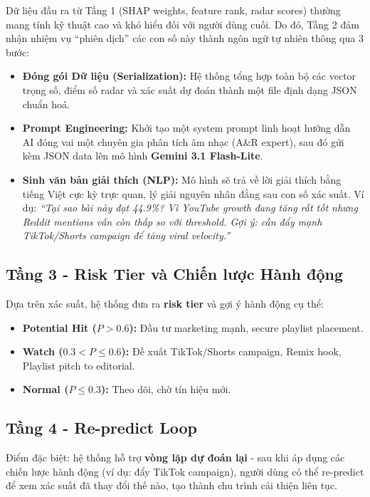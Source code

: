 \documentclass[12pt,a4paper]{report}
\begin{document}
Dữ liệu đầu ra từ Tầng 1 (SHAP weights, feature rank, radar scores) thường mang tính kỹ thuật cao và khó hiểu đối với người dùng cuối. Do đó, Tầng 2 đảm nhận nhiệm vụ ``phiên dịch'' các con số này thành ngôn ngữ tự nhiên thông qua 3 bước:
\begin{itemize}[leftmargin=*]
    \item \textbf{Đóng gói Dữ liệu (Serialization):} Hệ thống tổng hợp toàn bộ các vector trọng số, điểm số radar và xác suất dự đoán thành một file định dạng JSON chuẩn hoá.
    \item \textbf{Prompt Engineering:} Khởi tạo một system prompt linh hoạt hướng dẫn AI đóng vai một chuyên gia phân tích âm nhạc (A\&R expert), sau đó gửi kèm JSON data lên mô hình \textbf{Gemini 3.1 Flash-Lite}.
    \item \textbf{Sinh văn bản giải thích (NLP):} Mô hình sẽ trả về lời giải thích bằng tiếng Việt cực kỳ trực quan, lý giải nguyên nhân đằng sau con số xác suất. Ví dụ: \textit{``Tại sao bài này đạt 44.9\%? Vì YouTube growth đang tăng rất tốt nhưng Reddit mentions vẫn còn thấp so với threshold. Gợi ý: cần đẩy mạnh TikTok/Shorts campaign để tăng viral velocity.''}
\end{itemize}

\subsection{Tầng 3 - Risk Tier và Chiến lược Hành động}

Dựa trên xác suất, hệ thống đưa ra \textbf{risk tier} và gợi ý hành động cụ thể:
\begin{itemize}
    \item \textbf{Potential Hit ($P > 0.6$):} Đầu tư marketing mạnh, secure playlist placement.
    \item \textbf{Watch ($0.3 < P \leq 0.6$):} Đề xuất TikTok/Shorts campaign, Remix hook, Playlist pitch to editorial.
    \item \textbf{Normal ($P \leq 0.3$):} Theo dõi, chờ tín hiệu mới.
\end{itemize}

\subsection{Tầng 4 - Re-predict Loop}

Điểm đặc biệt: hệ thống hỗ trợ \textbf{vòng lặp dự đoán lại} - sau khi áp dụng các chiến lược hành động (ví dụ: đẩy TikTok campaign), người dùng có thể re-predict để xem xác suất đã thay đổi thế nào, tạo thành chu trình cải thiện liên tục.
\end{document}
